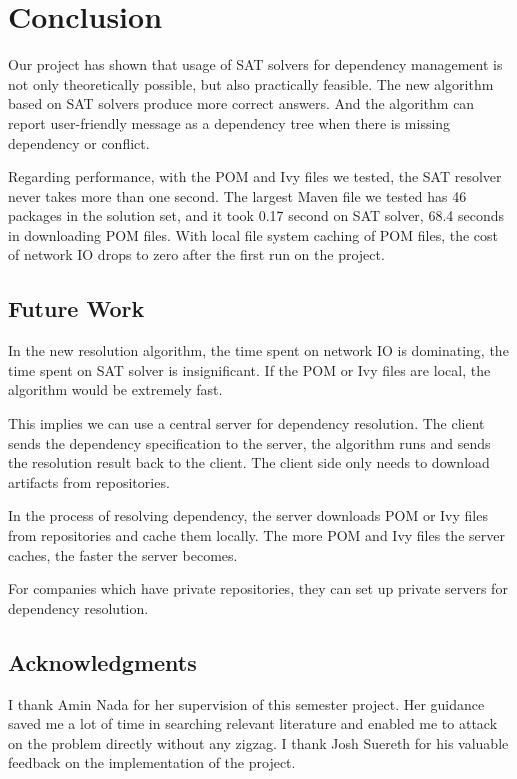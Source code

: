 \section{Conclusion}

Our project has shown that usage of SAT solvers for dependency management is not only theoretically possible, but also practically feasible. The new algorithm based on SAT solvers produce more correct answers. And the algorithm can report user-friendly message as a dependency tree when there is missing dependency or conflict.

Regarding performance, with the POM and Ivy files we tested, the SAT resolver never takes more than one second. The largest Maven file we tested has 46 packages in the solution set, and it took 0.17 second on SAT solver, 68.4 seconds in downloading POM files. With local file system caching of POM files, the cost of network IO drops to zero after the first run on the project.

\subsection{Future Work}

In the new resolution algorithm, the time spent on network IO is dominating, the time spent on SAT solver is insignificant. If the POM or Ivy files are local, the algorithm would be extremely fast.

This implies we can use a central server for dependency resolution. The client sends the dependency specification to the server, the algorithm runs and sends the resolution result back to the client. The client side only needs to download artifacts from repositories.

In the process of resolving dependency, the server downloads POM or Ivy files from repositories and cache them locally. The more POM and Ivy files the server caches, the faster the server becomes.

For companies which have private repositories, they can set up private servers for dependency resolution.

\subsection{Acknowledgments}

I thank Amin Nada for her supervision of this semester project. Her guidance saved me a lot of time in searching relevant literature and enabled me to attack on the problem directly without any zigzag. I thank Josh Suereth for his valuable feedback on the implementation of the project.
